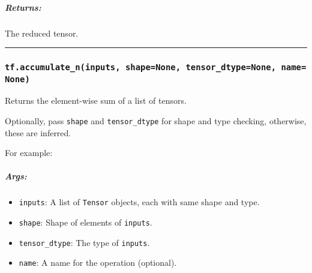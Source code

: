 \subparagraph{Returns: }\label{returns-44}

The reduced tensor.

\begin{center}\rule{0.5\linewidth}{\linethickness}\end{center}

\subsubsection{\texorpdfstring{\texttt{tf.accumulate\_n(inputs,\ shape=None,\ tensor\_dtype=None,\ name=None)}
}{tf.accumulate\_n(inputs, shape=None, tensor\_dtype=None, name=None) }}\label{tf.accumulateux5fninputs-shapenone-tensorux5fdtypenone-namenone}

Returns the element-wise sum of a list of tensors.

Optionally, pass \texttt{shape} and \texttt{tensor\_dtype} for shape and
type checking, otherwise, these are inferred.

For example:

\begin{Shaded}
\begin{Highlighting}[]
\CommentTok{# tensor 'a' is [[1, 2], [3, 4]}
\OperatorTok{==>} \NormalTok{[[}\NormalTok{, }\NormalTok{], [}\NormalTok{, }\NormalTok{]]}

\OperatorTok{=}\NormalTok{[}\NormalTok{, }\NormalTok{], tensor_dtype}\OperatorTok{=}
  \OperatorTok{==>} \NormalTok{[[}\NormalTok{, }\NormalTok{], [}\NormalTok{, }\NormalTok{]]}
\end{Highlighting}
\end{Shaded}

\subparagraph{Args: }\label{args-45}

\begin{itemize}
\tightlist
\item
  \texttt{inputs}: A list of \texttt{Tensor} objects, each with same
  shape and type.
\item
  \texttt{shape}: Shape of elements of \texttt{inputs}.
\item
  \texttt{tensor\_dtype}: The type of \texttt{inputs}.
\item
  \texttt{name}: A name for the operation (optional).
\end{itemize}

